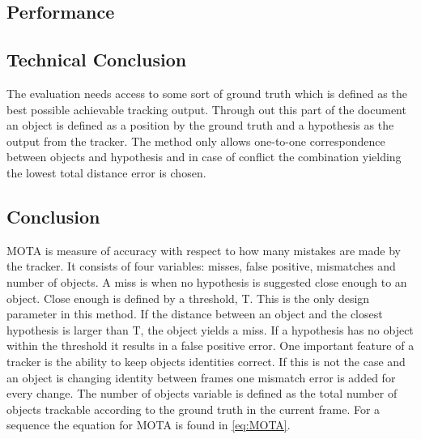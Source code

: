 \subsection{Performance}


\subsection{Technical Conclusion}
The evaluation needs access to some sort of ground truth which is defined as the best possible achievable tracking output. Through out this part of the document an object is defined as a position by the ground truth and a hypothesis as the output from the tracker. The method only allows one-to-one correspondence between objects and hypothesis and in case of conflict the combination yielding the lowest total distance error is chosen.

\subsection{Conclusion}
MOTA is measure of accuracy with respect to how many mistakes are made by the tracker. It consists of four variables: misses, false positive, mismatches and number of objects. A miss is when no hypothesis is suggested close enough to an object. Close enough is defined by a threshold, T. This is the only design parameter in this method. If the distance between an object and the closest hypothesis is larger than T, the object yields a miss. If a hypothesis has no object within the threshold it results in a false positive error. One important feature of a tracker is the ability to keep objects identities correct. If this is not the case and an object is changing identity between frames one mismatch error is added for every change. The number of objects variable is defined as the total number of objects trackable according to the ground truth in the current frame. For a sequence the equation for MOTA is found in \eqref{eq:MOTA}.




